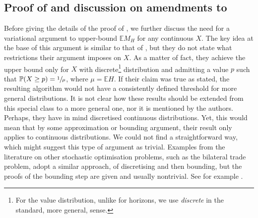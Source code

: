 \documentclass[11pt, a4paper, twoside]{article}
\newcommand{\EE}{\mathbb{E}}
\newcommand{\PP}{\mathbb{P}}
\numberwithin{equation}{section}
\begin{document}
	\subsection{Proof of  and discussion on amendments to \cite{AliBanGolMunWan20}}\label{suppGclassmax}
	Before giving the details of the proof of , we further discuss the need for a variational argument to upper-bound $\EE M_H$ for any continuous $X$. The key idea at the base of this argument is similar to that of \cite[Theorem~3.2]{AliBanGolMunWan20}, but they do not state what restrictions their argument imposes on $X$. As a matter of fact, they achieve the upper bound only for $X$ with discrete\footnote{For the value distribution, unlike for horizons, we use \textit{discrete} in the standard, more general, sense.} distribution and admitting a value $p$ such that $\PP(X\geq p)=\sfrac{1}{\mu}$, where $\mu=\EE H$. If their claim was true as stated, the resulting algorithm would not have a consistently defined threshold for more general distributions. It is not clear how these results should be extended from this special class to a more general one, nor it is mentioned by the authors. Perhaps, they have in mind discretised continuous distributions. Yet, this would mean that by some approximation or bounding argument, their result only applies to continuous distributions. We could not find a straightforward way, which might suggest this type of argument as trivial. Examples from the literature on other stochastic optimisation problems, such as the bilateral trade problem, adopt a similar approach, of discretising and then bounding, but the proofs of the bounding step are given and usually nontrivial. See for example \cite{CaiWu23}.
\end{document}
